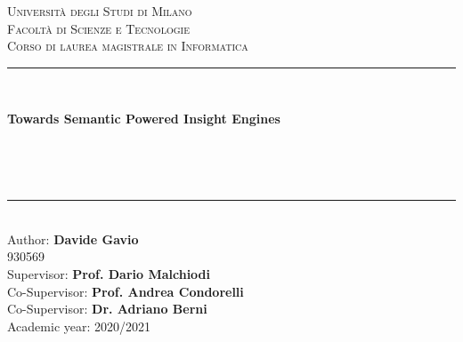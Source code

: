 \documentclass[\main/main.tex]{subfiles}
\begin{document}
\pagestyle{empty} %
\begin{titlepage}
	\begin{center}
		\vfill
		{\large \scshape Università degli Studi di Milano}\\[0.1cm]
		{\large \scshape Facoltà di Scienze e Tecnologie}\\[0.1cm]
		{\large \scshape Corso di laurea magistrale in Informatica}\\[0.5cm]
		\rule{\textwidth}{1.5pt}\\[0cm]
		{\huge \bfseries  Towards Semantic Powered Insight Engines \par \ }\\[-0.5cm]
		\rule{\textwidth}{1.5pt}\\[2.5cm]
		{\hfill \large Author: \textbf{Davide Gavio}} \\
		\vspace{0.1cm}
		{\hfill \large 930569} \\
		\vspace{0.5cm}
		{\hfill \large Supervisor: \textbf{Prof. Dario Malchiodi}} \\
	    {\hfill \large Co-Supervisor: \textbf{Prof. Andrea Condorelli} \\}
	    {\hfill \large Co-Supervisor: \textbf{Dr. Adriano Berni} \\}
	    \vspace{1cm}
		\hfill  Academic year: 2020/2021
	\end{center}
\end{titlepage}
\end{document}
